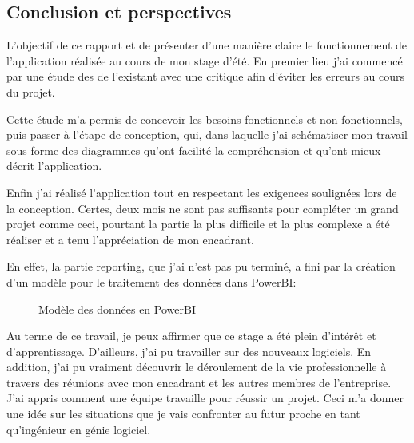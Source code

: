 \documentclass[a4paper]{report}
\begin{document}
\begin{doublespace}
	\chapter{Conclusion et perspectives}

	L’objectif de ce rapport et de présenter d’une manière claire le fonctionnement de l'application
	réalisée au cours de mon stage d’été. En premier lieu j'ai commencé par
	une étude des de l’existant avec une critique afin d'éviter les erreurs au cours du
	projet.

	Cette étude m'a permis de concevoir les besoins fonctionnels et non fonctionnels, puis passer
	à l’étape de conception, qui, dans laquelle j'ai schématiser mon travail sous forme des
	diagrammes qu'ont facilité la compréhension et qu'ont mieux décrit l'application.

	Enfin j'ai réalisé l'application tout en respectant les exigences soulignées lors de
	la conception. Certes, deux mois ne sont pas suffisants pour compléter un grand projet comme ceci,
	pourtant la partie la plus difficile et la plus complexe a été réaliser et  a tenu l'appréciation de mon
	encadrant.

	En effet, la partie reporting, que j'ai n'est pas pu terminé, a fini par la création d'un
	modèle pour le traitement des données dans PowerBI:
	\begin{figure}[H]
		\begin{center}
			\caption{Modèle des données en PowerBI }
		\end{center}
	\end{figure}

	Au terme de ce travail, je peux affirmer que ce stage a été plein d’intérêt et d'apprentissage. D'ailleurs, j'ai pu travailler sur des nouveaux logiciels.
	En addition, j'ai pu vraiment découvrir le déroulement de la vie professionnelle à travers des réunions
	avec mon encadrant et les autres membres de l’entreprise.
	J'ai appris comment une équipe travaille pour réussir un projet. Ceci m'a donner une
	idée sur les situations que je vais confronter au futur proche en tant qu'ingénieur en génie logiciel.


\end{doublespace}
\end{document}
